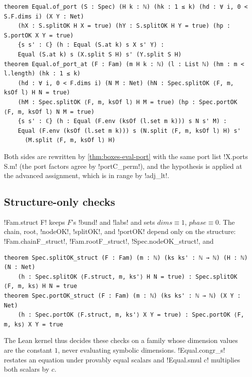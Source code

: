 {\begin{theorem}\label{thm:boxes-of-port}
\begin{lstlisting}[style=leanbox]
theorem Equal.of_port (S : Spec) (H k : ℕ) (hk : 1 ≤ k) (hd : ∀ i, 0 < S.F.dims i) (X Y : Net)
    (hX : S.splitOK H X = true) (hY : S.splitOK H Y = true) (hp : S.portOK X Y = true)
    {s s' : ℂ} (h : Equal (S.at k) s X s' Y) :
    Equal (S.at k) s (X.split S H) s' (Y.split S H)
theorem Equal.of_port_at (F : Fam) (m H k : ℕ) (l : List ℕ) (hm : m < l.length) (hk : 1 ≤ k)
    (hd : ∀ i, 0 < F.dims i) (N M : Net) (hN : Spec.splitOK ⟨F, m, ksOf l⟩ H N = true)
    (hM : Spec.splitOK ⟨F, m, ksOf l⟩ H M = true) (hp : Spec.portOK ⟨F, m, ksOf l⟩ N M = true)
    {s s' : ℂ} (h : Equal (F.env (ksOf (l.set m k))) s N s' M) :
    Equal (F.env (ksOf (l.set m k))) s (N.split ⟨F, m, ksOf l⟩ H) s'
      (M.split ⟨F, m, ksOf l⟩ H)
\end{lstlisting}
\end{theorem}
\noindent Both sides are rewritten by \cref{thm:boxes-eval-port} with the same port list \lbx!X.ports S.m! (the port factors agree by \lbx!portC_perm!), and the hypothesis is applied at the advanced assignment, which is in range by \lbx!adj_lt!.

\subsection{Structure-only checks}\label{sec:boxes-port-struct}
\lbx!Fam.struct F! keeps $F$'s \lbx!bund! and \lbx!labs! and sets $\mathit{dims}\equiv1$, $\mathit{phase}\equiv0$. The chain, root, \lbx!nodeOK!, \lbx!splitOK!, and \lbx!portOK! depend only on the structure: \lbx!Fam.chainF_struct!, \lbx!Fam.rootF_struct!, \lbx!Spec.nodeOK_struct!, and
\begin{lstlisting}[style=leanbox]
theorem Spec.splitOK_struct (F : Fam) (m : ℕ) (ks ks' : ℕ → ℕ) (H : ℕ) (N : Net)
    (h : Spec.splitOK ⟨F.struct, m, ks'⟩ H N = true) : Spec.splitOK ⟨F, m, ks⟩ H N = true
theorem Spec.portOK_struct (F : Fam) (m : ℕ) (ks ks' : ℕ → ℕ) (X Y : Net)
    (h : Spec.portOK ⟨F.struct, m, ks'⟩ X Y = true) : Spec.portOK ⟨F, m, ks⟩ X Y = true
\end{lstlisting}
The Lean kernel thus decides these checks on a family whose dimension values are the constant $1$, never evaluating symbolic dimensions. \lbx!Equal.congr_s! restates an equation under provably equal scalars and \lbx!Equal.smul c! multiplies both scalars by $c$.

}
